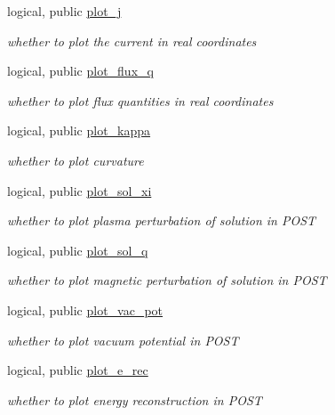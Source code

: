 \begin{DoxyCompactItemize}
logical, public \hyperlink{namespacenum__vars_aa5519c9217b33a3a677e058723638fa9}{plot\+\_\+j}
\begin{DoxyCompactList}\small\item\em whether to plot the current in real coordinates \end{DoxyCompactList}\item 
logical, public \hyperlink{namespacenum__vars_a3b821da571f91f9ec665538209b995a6}{plot\+\_\+flux\+\_\+q}
\begin{DoxyCompactList}\small\item\em whether to plot flux quantities in real coordinates \end{DoxyCompactList}\item 
logical, public \hyperlink{namespacenum__vars_a15a00106d8f59e98ab924f905cf2ddac}{plot\+\_\+kappa}
\begin{DoxyCompactList}\small\item\em whether to plot curvature \end{DoxyCompactList}\item 
logical, public \hyperlink{namespacenum__vars_aca13a9c68dbf136ed2a2a8e0fa04c087}{plot\+\_\+sol\+\_\+xi}
\begin{DoxyCompactList}\small\item\em whether to plot plasma perturbation of solution in P\+O\+ST \end{DoxyCompactList}\item 
logical, public \hyperlink{namespacenum__vars_a478a829f8ec3af3e57e91bf48732a5e1}{plot\+\_\+sol\+\_\+q}
\begin{DoxyCompactList}\small\item\em whether to plot magnetic perturbation of solution in P\+O\+ST \end{DoxyCompactList}\item 
logical, public \hyperlink{namespacenum__vars_a641ae7ad0ef7673f5a3f6966d311d8cc}{plot\+\_\+vac\+\_\+pot}
\begin{DoxyCompactList}\small\item\em whether to plot vacuum potential in P\+O\+ST \end{DoxyCompactList}\item 
logical, public \hyperlink{namespacenum__vars_ae90f876bc701020d565d6e77c4dc8c61}{plot\+\_\+e\+\_\+rec}
\begin{DoxyCompactList}\small\item\em whether to plot energy reconstruction in P\+O\+ST \end{DoxyCompactList}\item 

\end{DoxyCompactItemize}
